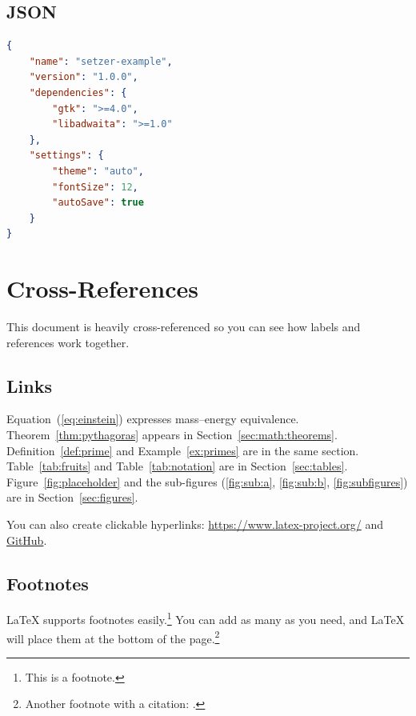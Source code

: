 \documentclass[11pt]{article}
\theoremstyle{definition}
\theoremstyle{plain}
\begin{document}
\subsection{JSON}
\label{sec:code:json}

\begin{lstlisting}[language=JSON, caption={A sample configuration file.}]
{
    "name": "setzer-example",
    "version": "1.0.0",
    "dependencies": {
        "gtk": ">=4.0",
        "libadwaita": ">=1.0"
    },
    "settings": {
        "theme": "auto",
        "fontSize": 12,
        "autoSave": true
    }
}
\end{lstlisting}

\section{Cross-References}
\label{sec:references}

This document is heavily cross-referenced so you can see how labels
and references work together.

\subsection{Links}
\label{sec:references:links}

Equation~(\ref{eq:einstein}) expresses mass--energy equivalence.
Theorem~\ref{thm:pythagoras} appears in Section~\ref{sec:math:theorems}.
Definition~\ref{def:prime} and Example~\ref{ex:primes} are in the same
section.
Table~\ref{tab:fruits} and Table~\ref{tab:notation} are in
Section~\ref{sec:tables}.
Figure~\ref{fig:placeholder} and the sub-figures
(\ref{fig:sub:a}, \ref{fig:sub:b}, \ref{fig:subfigures}) are in
Section~\ref{sec:figures}.

You can also create clickable hyperlinks:
\url{https://www.latex-project.org/} and
\href{https://github.com/}{GitHub}.

\subsection{Footnotes}
\label{sec:references:footnotes}

\LaTeX{} supports footnotes easily.\footnote{This is a footnote.}
You can add as many as you need, and \LaTeX{} will place them at the
bottom of the page.\footnote{Another footnote with a citation:
\cite{knuth1986}.}

\end{document}
